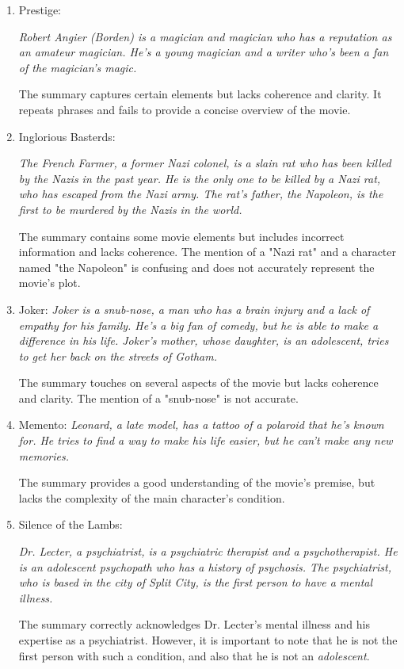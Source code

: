 \documentclass[fleqn,moreauthors,10pt]{ds_report}
\begin{document}
\begin{enumerate}[noitemsep]
	\item     Prestige:
 
    \textit{Robert Angier (Borden) is a magician and magician who has a reputation as an amateur magician. He's a young magician and a writer who's been a fan of the magician's magic.}
    
    The summary captures certain elements but lacks coherence and clarity. It repeats phrases and fails to provide a concise overview of the movie.

    \item Inglorious Basterds:
    
    \textit{The French Farmer, a former Nazi colonel, is a slain rat who has been killed by the Nazis in the past year. He is the only one to be killed by a Nazi rat, who has escaped from the Nazi army. The rat's father, the Napoleon, is the first to be murdered by the Nazis in the world.}
    
    The summary contains some movie elements but includes incorrect information and lacks coherence. The mention of a "Nazi rat" and a character named "the Napoleon" is confusing and does not accurately represent the movie's plot.

    \item Joker:
    \textit{Joker is a snub-nose, a man who has a brain injury and a lack of empathy for his family. He's a big fan of comedy, but he is able to make a difference in his life. Joker's mother, whose daughter, is an adolescent, tries to get her back on the streets of Gotham.}
    
    The summary touches on several aspects of the movie but lacks coherence and clarity. The mention of a "snub-nose" is not accurate.

    \item Memento:
    \textit{Leonard, a late model, has a tattoo of a polaroid that he's known for. He tries to find a way to make his life easier, but he can't make any new memories.}
    
    The summary provides a good understanding of the movie's premise, but lacks the complexity of the main character's condition.

    \item Silence of the Lambs:
    
    \textit{Dr. Lecter, a psychiatrist, is a psychiatric therapist and a psychotherapist. He is an adolescent psychopath who has a history of psychosis. The psychiatrist, who is based in the city of Split City, is the first person to have a mental illness.}
    
    The summary correctly acknowledges Dr. Lecter's mental illness and his expertise as a psychiatrist. However, it is important to note that he is not the first person with such a condition, and also that he is not an \textit{adolescent}.
\end{enumerate}
\end{document}
